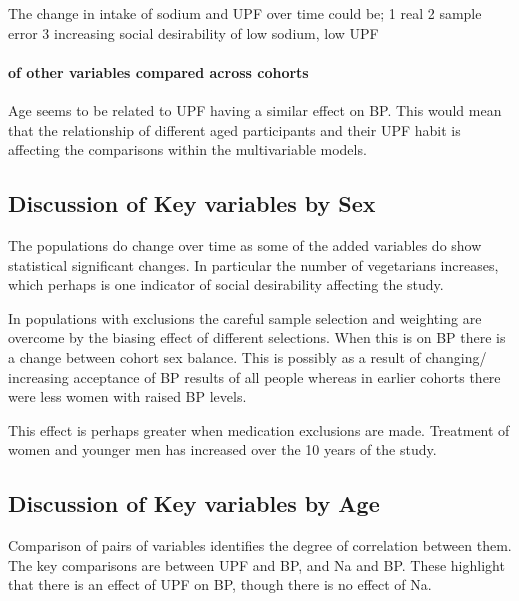 \documentclass[
]{article}
\begin{document}
The change in intake of sodium and UPF over time could be; 1 real 2
sample error 3 increasing social desirability of low sodium, low UPF

\hypertarget{of-other-variables-compared-across-cohorts}{%
\paragraph{of other variables compared across
cohorts}\label{of-other-variables-compared-across-cohorts}}

Age seems to be related to UPF having a similar effect on BP. This would
mean that the relationship of different aged participants and their UPF
habit is affecting the comparisons within the multivariable models.

\hypertarget{discussion-of-key-variables-by-sex}{%
\subsection{Discussion of Key variables by
Sex}\label{discussion-of-key-variables-by-sex}}

The populations do change over time as some of the added variables do
show statistical significant changes. In particular the number of
vegetarians increases, which perhaps is one indicator of social
desirability affecting the study.

In populations with exclusions the careful sample selection and
weighting are overcome by the biasing effect of different selections.
When this is on BP there is a change between cohort sex balance. This is
possibly as a result of changing/ increasing acceptance of BP results of
all people whereas in earlier cohorts there were less women with raised
BP levels.

This effect is perhaps greater when medication exclusions are made.
Treatment of women and younger men has increased over the 10 years of
the study.

\hypertarget{discussion-of-key-variables-by-age}{%
\subsection{Discussion of Key variables by
Age}\label{discussion-of-key-variables-by-age}}

Comparison of pairs of variables identifies the degree of correlation
between them. The key comparisons are between UPF and BP, and Na and BP.
These highlight that there is an effect of UPF on BP, though there is no
effect of Na.
\end{document}
